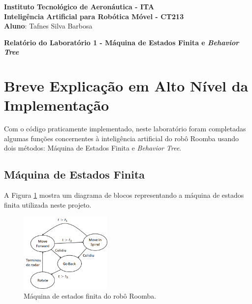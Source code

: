 \documentclass[brazil, 12pt]{article}
\begin{document}
\begin{center}
\textbf{Instituto Tecnológico de Aeronáutica - ITA} \\
\textbf{Inteligência Artificial para Robótica Móvel - CT213} \\
\textbf{Aluno}: Tafnes Silva Barbosa     %
\end{center}

\begin{center}
\textbf{Relatório do Laboratório 1 - Máquina de Estados Finita e \emph{Behavior Tree}}
\end{center}
\vspace*{0.5cm}

\section{Breve Explicação em Alto Nível da Implementação}
Com o código praticamente implementado, neste laboratório foram completadas algumas funções concernentes à inteligência artificial do robô Roomba usando dois métodos: Máquina de Estados Finita e \textit{Behavior Tree}.

\subsection{Máquina de Estados Finita}
A Figura \ref{fig:FSM} mostra um diagrama de blocos representando a máquina de estados finita utilizada neste projeto.

\begin{figure}[H]
	\centering
	\includegraphics[width=0.4\textwidth]{FSM} %
	\caption{Máquina de estados finita do robô Roomba.} %
	\label{fig:FSM}  %
\end{figure} 
\end{document}
